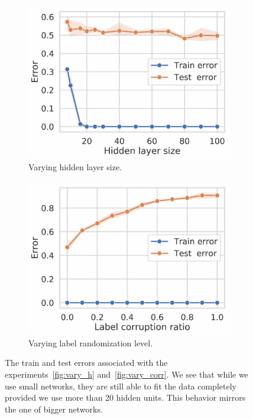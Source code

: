 \begin{figure}[H]
  \centering
  \begin{subfigure}[b]{0.45\textwidth}
    \includegraphics[width=\textwidth]{articles/hfc/traincurves_hidden_size-2.pdf}
    \caption{Varying hidden layer size.}
  \end{subfigure}
  \hfill
  \begin{subfigure}[b]{0.45\textwidth}
    \includegraphics[width=\textwidth]{articles/hfc/traincurves_corrupt-2.pdf}
    \caption{Varying label randomization level.}
  \end{subfigure}
\caption{The train and test errors associated with the experiments~\ref{fig:vary_h} and~\ref{fig:vary_corr}. We see that while we use small networks, they are still able to fit the data completely provided we use more than 20 hidden units. This behavior mirrors the one of bigger networks.}
\end{figure}
